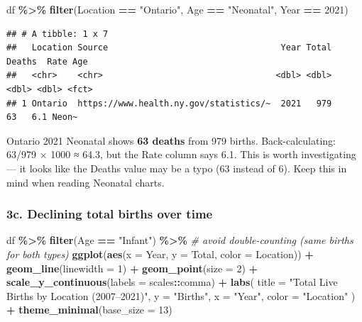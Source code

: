 \documentclass[
]{article}
\newenvironment{Shaded}{\begin{snugshade}}{\end{snugshade}}
\newcommand{\AttributeTok}[1]{\textcolor[rgb]{0.13,0.29,0.53}{#1}}
\newcommand{\CommentTok}[1]{\textcolor[rgb]{0.56,0.35,0.01}{\textit{#1}}}
\newcommand{\DecValTok}[1]{\textcolor[rgb]{0.00,0.00,0.81}{#1}}
\newcommand{\FunctionTok}[1]{\textcolor[rgb]{0.13,0.29,0.53}{\textbf{#1}}}
\newcommand{\NormalTok}[1]{#1}
\newcommand{\SpecialCharTok}[1]{\textcolor[rgb]{0.81,0.36,0.00}{\textbf{#1}}}
\newcommand{\StringTok}[1]{\textcolor[rgb]{0.31,0.60,0.02}{#1}}
\begin{document}
\begin{Shaded}
\begin{Highlighting}[]
\NormalTok{df }\SpecialCharTok{\%\textgreater{}\%}
  \FunctionTok{filter}\NormalTok{(Location }\SpecialCharTok{==} \StringTok{"Ontario"}\NormalTok{, Age }\SpecialCharTok{==} \StringTok{"Neonatal"}\NormalTok{, Year }\SpecialCharTok{==} \DecValTok{2021}\NormalTok{)}
\end{Highlighting}
\end{Shaded}

\begin{verbatim}
## # A tibble: 1 x 7
##   Location Source                                  Year Total Deaths  Rate Age  
##   <chr>    <chr>                                  <dbl> <dbl>  <dbl> <dbl> <fct>
## 1 Ontario  https://www.health.ny.gov/statistics/~  2021   979     63   6.1 Neon~
\end{verbatim}

Ontario 2021 Neonatal shows \textbf{63 deaths} from 979 births.
Back-calculating: 63/979 × 1000 ≈ 64.3, but the Rate column says 6.1.
This is worth investigating --- it looks like the Deaths value may be a
typo (63 instead of 6). Keep this in mind when reading Neonatal charts.

\subsubsection{3c. Declining total births over
time}\label{c.-declining-total-births-over-time}

\begin{Shaded}
\begin{Highlighting}[]
\NormalTok{df }\SpecialCharTok{\%\textgreater{}\%}
  \FunctionTok{filter}\NormalTok{(Age }\SpecialCharTok{==} \StringTok{"Infant"}\NormalTok{) }\SpecialCharTok{\%\textgreater{}\%}           \CommentTok{\# avoid double{-}counting (same births for both types)}
  \FunctionTok{ggplot}\NormalTok{(}\FunctionTok{aes}\NormalTok{(}\AttributeTok{x =}\NormalTok{ Year, }\AttributeTok{y =}\NormalTok{ Total, }\AttributeTok{color =}\NormalTok{ Location)) }\SpecialCharTok{+}
  \FunctionTok{geom\_line}\NormalTok{(}\AttributeTok{linewidth =} \DecValTok{1}\NormalTok{) }\SpecialCharTok{+}
  \FunctionTok{geom\_point}\NormalTok{(}\AttributeTok{size =} \DecValTok{2}\NormalTok{) }\SpecialCharTok{+}
  \FunctionTok{scale\_y\_continuous}\NormalTok{(}\AttributeTok{labels =}\NormalTok{ scales}\SpecialCharTok{::}\NormalTok{comma) }\SpecialCharTok{+}
  \FunctionTok{labs}\NormalTok{(}
    \AttributeTok{title   =} \StringTok{"Total Live Births by Location (2007–2021)"}\NormalTok{,}
    \AttributeTok{y       =} \StringTok{"Births"}\NormalTok{,}
    \AttributeTok{x       =} \StringTok{"Year"}\NormalTok{,}
    \AttributeTok{color   =} \StringTok{"Location"}
\NormalTok{  ) }\SpecialCharTok{+}
  \FunctionTok{theme\_minimal}\NormalTok{(}\AttributeTok{base\_size =} \DecValTok{13}\NormalTok{)}
\end{Highlighting}
\end{Shaded}
\end{document}
